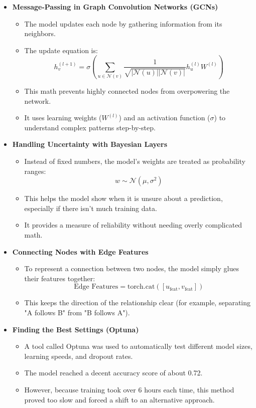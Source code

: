 \documentclass[11pt,a4paper]{article}
\begin{document}
\begin{itemize}

    \item \textbf{Message-Passing in Graph Convolution Networks (GCNs)}
    \begin{itemize}
        \item The model updates each node by gathering information from its neighbors.
        \item The update equation is:
        \[ h_v^{(l+1)} = \sigma\left(\sum_{u \in \mathcal{N}(v)} \frac{1}{\sqrt{|\mathcal{N}(u)||\mathcal{N}(v)|}} h_u^{(l)} W^{(l)}\right) \]
        \item This math prevents highly connected nodes from overpowering the network.
        \item It uses learning weights ($W^{(l)}$) and an activation function ($\sigma$) to understand complex patterns step-by-step.
    \end{itemize}

    \item \textbf{Handling Uncertainty with Bayesian Layers}
    \begin{itemize}
        \item Instead of fixed numbers, the model's weights are treated as probability ranges:
        \[ w \sim \mathcal{N}(\mu, \sigma^2) \]
        \item This helps the model show when it is unsure about a prediction, especially if there isn't much training data.
        \item It provides a measure of reliability without needing overly complicated math.
    \end{itemize}

    \item \textbf{Connecting Nodes with Edge Features}
    \begin{itemize}
        \item To represent a connection between two nodes, the model simply glues their features together:
        \[ \text{Edge Features} = \text{torch.cat}([u_{\text{feat}}, v_{\text{feat}}]) \]
        \item This keeps the direction of the relationship clear (for example, separating "A follows B" from "B follows A").
    \end{itemize}

    \item \textbf{Finding the Best Settings (Optuna)}
    \begin{itemize}
        \item A tool called Optuna was used to automatically test different model sizes, learning speeds, and dropout rates.
        \item The model reached a decent accuracy score of about 0.72.
        \item However, because training took over 6 hours each time, this method proved too slow and forced a shift to an alternative approach.
    \end{itemize}

\end{itemize}
\end{document}
